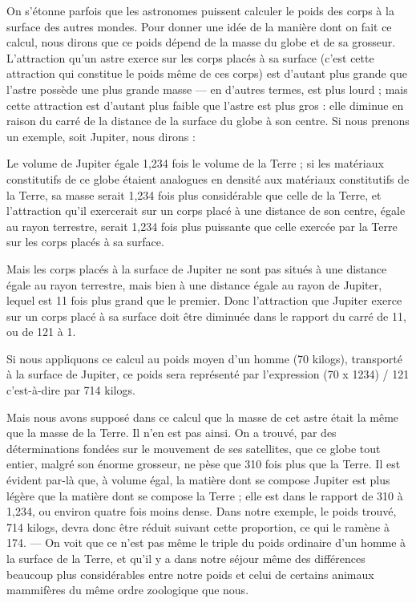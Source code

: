 \documentclass[a4paper, 11pt, oneside]{article}
\begin{document}
On s'étonne parfois que les astronomes puissent calculer le poids des corps à la surface des autres mondes. Pour donner une idée de la manière dont on fait ce calcul, nous dirons que ce poids dépend de la masse du globe et de sa grosseur. L'attraction qu'un astre exerce sur les corps placés à sa surface (c'est cette attraction qui constitue le poids même de ces corps) est d'autant plus grande que l'astre possède une plus grande masse --- en d'autres termes, est plus lourd ; mais cette attraction est d'autant plus faible que l'astre est plus gros : elle diminue en raison du carré de la distance de la surface du globe à son centre. Si nous prenons un exemple, soit Jupiter, nous dirons :

Le volume de Jupiter égale 1,234 fois le volume de la Terre ; si les matériaux constitutifs de ce globe étaient analogues en densité aux matériaux constitutifs de la Terre, sa masse serait 1,234 fois plus considérable que celle de la Terre, et l'attraction qu'il exercerait sur un corps placé à une distance de son centre, égale au rayon terrestre, serait 1,234 fois plus puissante que celle exercée par la Terre sur les corps placés à sa surface.

Mais les corps placés à la surface de Jupiter ne sont pas situés à une distance égale au rayon terrestre, mais bien à une distance égale au rayon de Jupiter, lequel est 11 fois plus grand que le premier. Donc l'attraction que Jupiter exerce sur un corps placé à sa surface doit être diminuée dans le rapport du carré de 11, ou de 121 à 1.

Si nous appliquons ce calcul au poids moyen d'un homme (70 kilogs), transporté à la surface de Jupiter, ce poids sera représenté par l'expression (70 x 1234) / 121 c'est-à-dire par 714 kilogs.

Mais nous avons supposé dans ce calcul que la masse de cet astre était la même que la masse de la Terre. Il n'en est pas ainsi. On a trouvé, par des déterminations fondées sur le mouvement de ses satellites, que ce globe tout entier, malgré son énorme grosseur, ne pèse que 310 fois plus que la Terre. Il est évident par-là que, à volume égal, la matière dont se compose Jupiter est plus légère que la matière dont se compose la Terre ; elle est dans le rapport de 310 à 1,234, ou environ quatre fois moins dense. Dans notre exemple, le poids trouvé, 714 kilogs, devra donc être réduit suivant cette proportion, ce qui le ramène à 174. --- On voit que ce n'est pas même le triple du poids ordinaire d'un homme à la surface de la Terre, et qu'il y a dans notre séjour même des différences beaucoup plus considérables entre notre poids et celui de certains animaux mammifères du même ordre zoologique que nous.
\end{document}
